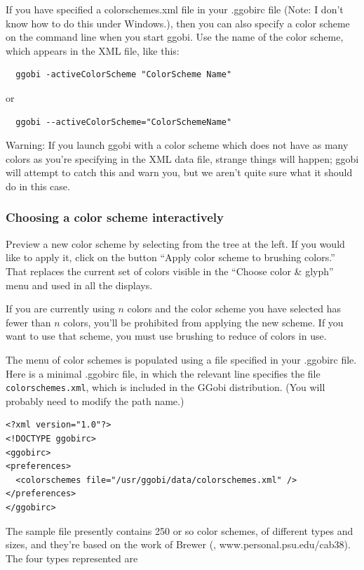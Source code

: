 \documentclass[11pt]{article}
\begin{document}
If you have specified a colorschemes.xml file in your .ggobirc file
(Note: I don't know how to do this under Windows.),
then you can also specify a color scheme on the command line when you
start ggobi.  Use the name of the color scheme, which appears in the
XML file, like this:

\begin{verbatim}
  ggobi -activeColorScheme "ColorScheme Name"
\end{verbatim}
  or   
\begin{verbatim}
  ggobi --activeColorScheme="ColorSchemeName"
\end{verbatim}

Warning: If you launch ggobi with a color scheme which does not have
as many colors as you're specifying in the XML data file, strange
things will happen; ggobi will attempt to catch this and warn you,
but we aren't quite sure what it should do in this case.

\subsubsection{Choosing a color scheme interactively}

Preview a new color scheme by selecting from the tree at the left.
If you would like to apply it, click on the button ``Apply color scheme
to brushing colors.''  That replaces the current set of colors visible
in the ``Choose color \& glyph'' menu and used in all the displays.

If you are currently using $n$ colors and the color scheme you have
selected has fewer than $n$ colors, you'll be prohibited from applying
the new scheme.  If you want to use that scheme, you must use brushing
to reduce of colors in use.

The menu of color schemes is populated using a file specified in your
.ggobirc file.  Here is a minimal .ggobirc file, in which the relevant
line specifies the file {\tt colorschemes.xml}, which is included in the
GGobi distribution.  (You will probably need to modify the path name.)

\begin{verbatim}
<?xml version="1.0"?>
<!DOCTYPE ggobirc>
<ggobirc>
<preferences>
  <colorschemes file="/usr/ggobi/data/colorschemes.xml" />
</preferences>
</ggobirc>
\end{verbatim}

The sample file presently contains 250 or so color schemes, of
different types and sizes, and they're based on the work of
Brewer (\cite{Brewer99}, www.personal.psu.edu/cab38).
The four types represented are
\end{document}
